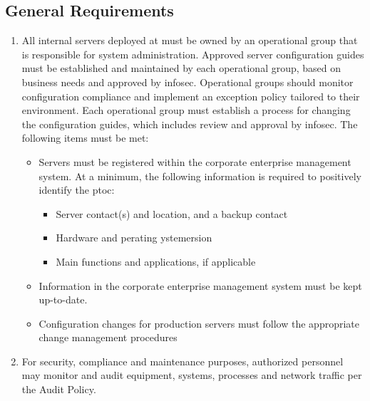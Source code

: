 \subsection{General Requirements}
\begin{enumerate}
\item
All internal servers deployed at \CompanyName{} must be owned by an operational group that is responsible for system administration.  
Approved server configuration guides must be established and maintained by each operational group, based on business needs and approved by \gls{infosec}.  
Operational groups should monitor configuration compliance and implement an exception policy tailored to their environment.  
Each operational group must establish a process for changing the configuration guides, which includes review and approval by \gls{infosec}.  
The following items must be met:
\begin{itemize}
\item
Servers must be registered within the corporate enterprise management system.  
At a minimum, the following information is required to positively identify the \gls{ptoc}: 
\begin{itemize}
\item
Server contact(s) and location, and a backup contact 
\item
Hardware and perating ystem\oldnew{/}{ }ersion 
\item
Main functions and applications, if applicable 
\end{itemize}
\item
Information in the corporate enterprise management system must be kept up-to-date. 
\item
Configuration changes for production servers must follow the appropriate change management procedures
\end{itemize}
\item
For security, compliance\oxford{} and maintenance purposes, authorized personnel may monitor and audit equipment, systems, processes\oxford{} and network traffic per the Audit Policy.%
\end{enumerate}
